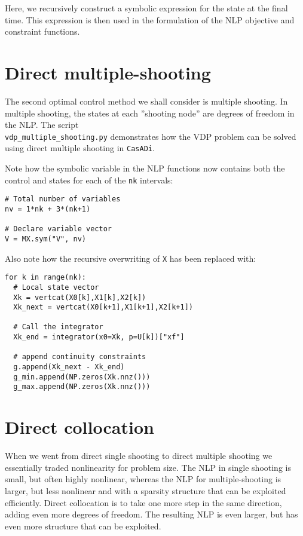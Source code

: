 \documentclass[a4paper,12pt]{book}
\newcommand{\CasADi}{\texttt{CasADi}\xspace}
\begin{document}
Here, we recursively construct a symbolic expression for the state at the final time. This expression is then used in the formulation of the NLP objective and constraint functions.

\section{Direct multiple-shooting}
The second optimal control method we shall consider is multiple shooting. In multiple shooting, the states at each ''shooting node'' are degrees of freedom in the NLP. The script \\ \texttt{vdp\_multiple\_shooting.py} demonstrates how the VDP problem can be solved using direct multiple shooting in \CasADi.

Note how the symbolic variable in the NLP functions now contains both the control and states for each of the \texttt{nk} intervals:
\begin{verbatim}
# Total number of variables
nv = 1*nk + 3*(nk+1)

# Declare variable vector
V = MX.sym("V", nv)
\end{verbatim}

Also note how the recursive overwriting of \texttt{X} has been replaced with:
\begin{verbatim}
for k in range(nk):
  # Local state vector
  Xk = vertcat(X0[k],X1[k],X2[k])
  Xk_next = vertcat(X0[k+1],X1[k+1],X2[k+1])

  # Call the integrator
  Xk_end = integrator(x0=Xk, p=U[k])["xf"]

  # append continuity constraints
  g.append(Xk_next - Xk_end)
  g_min.append(NP.zeros(Xk.nnz()))
  g_max.append(NP.zeros(Xk.nnz()))
\end{verbatim}

\section{Direct collocation}
When we went from direct single shooting to direct multiple shooting we essentially traded nonlinearity for problem size. The NLP in single shooting is small, but often highly nonlinear, whereas the NLP for multiple-shooting is larger, but less nonlinear and with a sparsity structure that can be exploited efficiently. Direct collocation is to take one more step in the same direction, adding even more degrees of freedom. The resulting NLP is even larger, but has even more structure that can be exploited.
\end{document}
